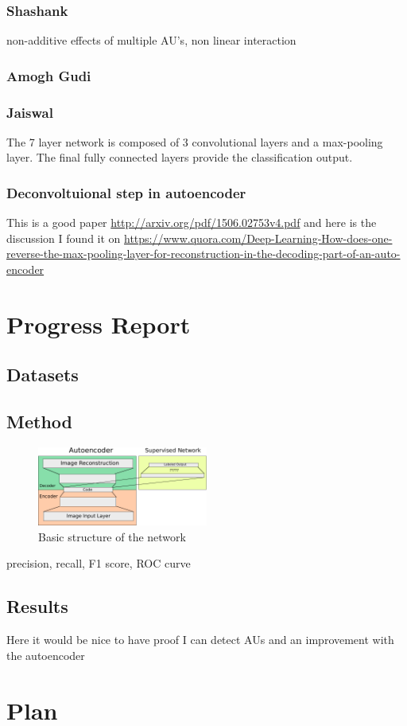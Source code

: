 \documentclass[11pt]{article} \usepackage{amsmath, amsthm, amssymb}
\begin{document}
\subsubsection*{Shashank}
non-additive
effects of multiple AU's, non linear interaction

\subsubsection*{Amogh Gudi}
\cite{Gudi2015}

\subsubsection*{Jaiswal}
\cite{Jaiswal2016}
The 7 layer network is composed of 3 convolutional
layers and a max-pooling layer. The final fully connected layers provide the
classification output.
\subsubsection*{Deconvoltuional step in autoencoder} This is
a good paper \url{http://arxiv.org/pdf/1506.02753v4.pdf} and here is the
discussion I found it on
\url{https://www.quora.com/Deep-Learning-How-does-one-reverse-the-max-pooling-layer-for-reconstruction-in-the-decoding-part-of-an-auto-encoder}


\section{Progress Report}
%
%
%
\subsection{Datasets}



%
%
%
\subsection{Method}
\begin{figure} \begin{center}
\includegraphics[width=0.5\textwidth]{illustrations/network_01.pdf} \end{center}
\caption{Basic structure of the network} \end{figure}
precision, recall, F1 score, ROC curve
%
%
%
\subsection{Results}
Here it would be nice to have proof I can detect AUs and an improvement with the autoencoder
%
%
%
\section{Plan}




\end{document}
